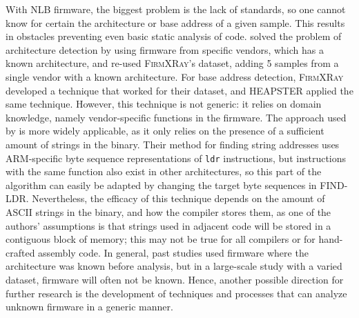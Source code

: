 With NLB firmware, the biggest problem is the lack of standards, so one cannot know for certain the architecture or base address of a given sample.
This results in obstacles preventing even basic static analysis of code.
 solved the problem of architecture detection by using firmware from specific vendors, which has a known architecture, and  re-used \textsc{FirmXRay}'s dataset, adding 5 samples from a single vendor with a known architecture.
For base address detection, \textsc{FirmXRay} developed a technique that worked for their dataset, and \textsc{HEAPSTER} applied the same technique.
However, this technique is not generic: it relies on domain knowledge, namely vendor-specific functions in the firmware.
The approach used by  is more widely applicable, as it only relies on the presence of a sufficient amount of strings in the binary.
Their method for finding string addresses uses ARM-specific byte sequence representations of \texttt{ldr} instructions, but instructions with the same function also exist in other architectures, so this part of the algorithm can easily be adapted by changing the target byte sequences in FIND-LDR.
Nevertheless, the efficacy of this technique depends on the amount of ASCII strings in the binary, and how the compiler stores them, as one of the authors' assumptions is that strings used in adjacent code will be stored in a contiguous block of memory; this may not be true for all compilers or for hand-crafted assembly code.
In general, past studies used firmware where the architecture was known before analysis, but in a large-scale study with a varied dataset, firmware will often not be known.
Hence, another possible direction for further research is the development of techniques and processes that can analyze unknown firmware in a generic manner.
